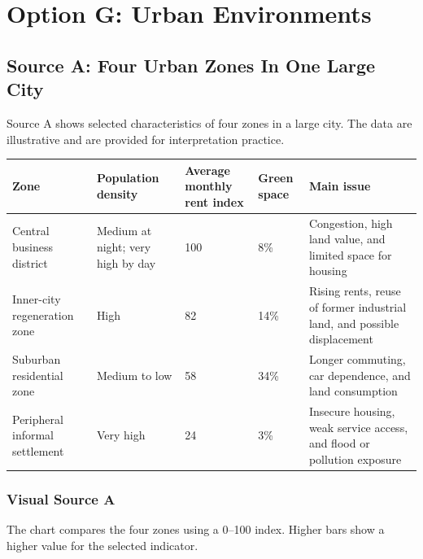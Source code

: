 \documentclass[11pt,a4paper]{article}
\begin{document}
\newpage

\section{Option G: Urban Environments}

\subsection{Source A: Four Urban Zones In One Large City}

Source A shows selected characteristics of four zones in a large city. The
data are illustrative and are provided for interpretation practice.

\begin{tabularx}{\textwidth}{L{0.18\textwidth}C{0.15\textwidth}C{0.16\textwidth}C{0.14\textwidth}Y}
\toprule
\textbf{Zone} & \textbf{Population density} & \textbf{Average monthly rent index}
& \textbf{Green space} & \textbf{Main issue} \\
\midrule
Central business district & Medium at night; very high by day & 100 & 8\% &
Congestion, high land value, and limited space for housing \\
Inner-city regeneration zone & High & 82 & 14\% & Rising rents, reuse of
former industrial land, and possible displacement \\
Suburban residential zone & Medium to low & 58 & 34\% & Longer commuting,
car dependence, and land consumption \\
Peripheral informal settlement & Very high & 24 & 3\% & Insecure housing,
weak service access, and flood or pollution exposure \\
\bottomrule
\end{tabularx}

\subsubsection{Visual Source A}

The chart compares the four zones using a 0--100 index. Higher bars show a
higher value for the selected indicator.
\end{document}
